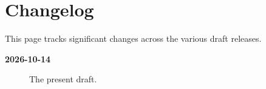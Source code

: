 \section*{Changelog}

This page tracks significant changes across the various draft releases.

\begin{description}

\item[\textbf{2026-10-14}]
  The present draft.

\end{description}


\newpage
